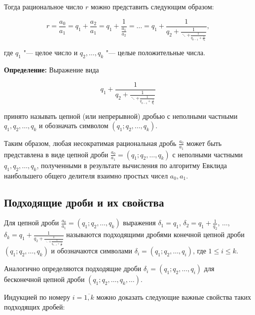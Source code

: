 \documentclass[bachelor, och, labwork]{shiza}
\begin{document}
        Тогда рациональное число $r$ можно представить следующим образом:

        $$r = \frac{a_0}{a_1} = q_1 + \frac{a_2}{a_1} = q_1 + \frac{1}{\frac{a_1}{a_2}} = \dots = q_1 + \frac{1}{q_2 + \frac{1}{\ddots + \frac{1}{q_{k-1} + \frac{1}{q_k}}}},$$

        где $q_1$ "--- целое число и $q_2, \dots, q_k$ "--- целые положительные
        числа.

        \textbf{Определение:} Выражение вида 

        $$q_1 + \frac{1}{q_2 + \frac{1}{\ddots + \frac{1}{q_{k-1} +
        \frac{1}{q_k}}}}$$

        принято называть цепной (или непрерывной) дробью с неполными частными
        $q_1, q_2, \dots, q_k$ и обозначать символом $(q_1 ; q_2, \dots, q_k).$

        Таким образом, любая несократимая рациональная дробь $\frac{a_0}{a_1}$
        может быть представлена в виде цепной дроби $\frac{a_0}{a_1} = (q_1 ;
        q_2, \dots, q_k)$ с неполными частными $q_1, q_2, \dots, q_k$,
        полученными в результате вычисления по алгоритму Евклида наибольшего
        общего делителя взаимно простых чисел $a_0, a_1$.

    \subsection{Подходящие дроби и их свойства}

        Для цепной дроби $\frac{a_0}{a_1} = (q_1 ; q_2, \dots, q_k)$ выражения
        $\delta_1 = q_1$, $\delta_2 = q_1 + \frac{1}{q_2}$, $\dots$, $\delta_k =
        q_1 + \frac{1}{q_2 + \frac{1}{\ddots + \frac{1}{q_{k-1} +
        \frac{1}{q_k}}}}$ называются подходящими дробями конечной цепной дроби
        $(q_1 ; q_2, \dots, q_k)$ и обозначаются символами $\delta_i = (q_1 ;
        q_2, \dots, q_i)$, где $1 \leq i \leq k$.

        Аналогично определяются подходящие дроби $\delta_i = (q_1 ; q_2, \dots,
        q_i)$ для бесконечной цепной дроби $(q_1 ; q_2, \dots, q_k, \dots)$.

        Индукцией по номеру $i = \overline{1,k}$ можно доказать следующие важные
        свойства таких подходящих дробей:
\end{document}
